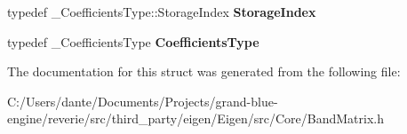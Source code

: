 \begin{DoxyCompactItemize}
typedef \+\_\+\+Coefficients\+Type\+::\+Storage\+Index {\bfseries Storage\+Index}
\item 
\mbox{\label{struct_eigen_1_1internal_1_1traits_3_01_band_matrix_wrapper_3_01___coefficients_type_00_01___row768e2717402a9eceb38d536f65ceb4f1_abffdc4d87f27cd7fa68c213d26b801f5}} 
typedef \+\_\+\+Coefficients\+Type {\bfseries Coefficients\+Type}
\end{DoxyCompactItemize}


The documentation for this struct was generated from the following file\+:\begin{DoxyCompactItemize}
\item 
C\+:/\+Users/dante/\+Documents/\+Projects/grand-\/blue-\/engine/reverie/src/third\+\_\+party/eigen/\+Eigen/src/\+Core/Band\+Matrix.\+h\end{DoxyCompactItemize}
